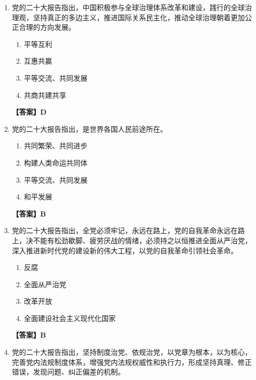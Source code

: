 \documentclass[UTF8,11pt,a4paper]{ctexart}
\begin{document}
\begin{enumerate}[label=\textbf{\arabic*.}, leftmargin=2.5em, itemsep=0.7em]
\begin{enumerate}[label=\Alph*., leftmargin=2em, itemsep=0.1em, topsep=0.15em]
\item 对外开放
\item 和平共处五项原则
\item 反对保护主义
\item 不结盟、不称霸、不扩张
\end{enumerate}
\textbf{【答案】A}
\item 党的二十大报告指出，中国积极参与全球治理体系改革和建设，践行\allowbreak\underline{\hspace{4em}}的全球治理观，坚持真正的多边主义，推进国际关系民主化，推动全球治理朝着更加公正合理的方向发展。
\begin{enumerate}[label=\Alph*., leftmargin=2em, itemsep=0.1em, topsep=0.15em]
\item 平等互利
\item 互惠共赢
\item 平等交流、共同发展
\item 共商共建共享
\end{enumerate}
\textbf{【答案】D}
\item 党的二十大报告指出，\allowbreak\underline{\hspace{4em}}是世界各国人民前途所在。
\begin{enumerate}[label=\Alph*., leftmargin=2em, itemsep=0.1em, topsep=0.15em]
\item 共同繁荣、共同进步
\item 构建人类命运共同体
\item 平等交流、共同发展
\item 和平发展
\end{enumerate}
\textbf{【答案】B}
\item 党的二十大报告指出，全党必须牢记，\allowbreak\underline{\hspace{4em}}永远在路上，党的自我革命永远在路上，决不能有松劲歇脚、疲劳厌战的情绪，必须持之以恒推进全面从严治党，深入推进新时代党的建设新的伟大工程，以党的自我革命引领社会革命。
\begin{enumerate}[label=\Alph*., leftmargin=2em, itemsep=0.1em, topsep=0.15em]
\item 反腐
\item 全面从严治党
\item 改革开放
\item 全面建设社会主义现代化国家
\end{enumerate}
\textbf{【答案】B}
\item 党的二十大报告指出，坚持制度治党、依规治党，以党章为根本，以\allowbreak\underline{\hspace{4em}}为核心，完善党内法规制度体系，增强党内法规权威性和执行力，形成坚持真理、修正错误，发现问题、纠正偏差的机制。

\end{enumerate}
\end{document}
